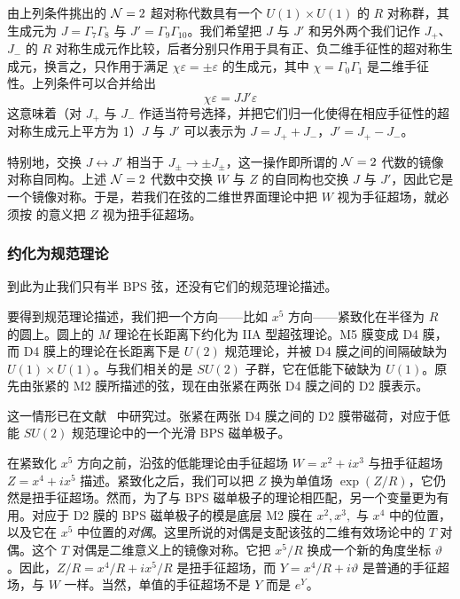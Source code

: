 
由上列条件挑出的 ${\mathcal N}=2$ 超对称代数具有一个 $U(1)\times U(1)$ 的 $R$ 对称群，其生成元为 $J=\Gamma_7\Gamma_8$ 与 $J'=\Gamma_9 \Gamma_{10}$。我们希望把 $J$ 与 $J'$ 和另外两个我们记作 $J_+$、$J_-$ 的 $R$ 对称生成元作比较，后者分别只作用于具有正、负二维手征性的超对称生成元，换言之，只作用于满足 $\chi\varepsilon=\pm \varepsilon$ 的生成元，其中 $\chi=\Gamma_0\Gamma_1$ 是二维手征性。上列条件可以合并给出
\begin{equation}\label{omly}\chi\varepsilon=JJ'\varepsilon\end{equation}
这意味着（对 $J_+$ 与 $J_-$ 作适当符号选择，并把它们归一化使得在相应手征性的超对称生成元上平方为 1）$J$ 与 $J'$ 可以表示为 $J=J_++J_-$，$J'=J_+-J_-$。

特别地，交换 $J\leftrightarrow J'$ 相当于 $J_\pm\to \pm J_\pm$，这一操作即所谓的 ${\mathcal N}=2$ 代数的镜像对称自同构。上述 ${\mathcal N}=2$ 代数中交换 $W$ 与 $Z$ 的自同构也交换 $J$ 与 $J'$，因此它是一个镜像对称。于是，若我们在弦的二维世界面理论中把 $W$ 视为手征超场，就必须按 \cite{GHR} 的意义把 $Z$ 视为扭手征超场。

\subsubsection{约化为规范理论}\label{gaugered}

到此为止我们只有半 BPS 弦，还没有它们的规范理论描述。

要得到规范理论描述，我们把一个方向——比如 $x^5$ 方向——紧致化在半径为 $R$ 的圆上。圆上的 $M$ 理论在长距离下约化为 IIA 型超弦理论。M5 膜变成 D4 膜，而 D4 膜上的理论在长距离下是 $U(2)$ 规范理论，并被 D4 膜之间的间隔破缺为 $U(1)\times U(1)$。与我们相关的是 $SU(2)$ 子群，它在低能下破缺为 $U(1)$。原先由张紧的 M2 膜所描述的弦，现在由张紧在两张 D4 膜之间的 D2 膜表示。

这一情形已在文献~\cite{diac} 中研究过。张紧在两张 D4 膜之间的 D2 膜带磁荷，对应于低能 $SU(2)$ 规范理论中的一个光滑 BPS 磁单极子。

在紧致化 $x^5$ 方向之前，沿弦的低能理论由手征超场 $W=x^2+ix^3$ 与扭手征超场 $Z=x^4+ix^5$ 描述。紧致化之后，我们可以把 $Z$ 换为单值场 $\exp(Z/R)$，它仍然是扭手征超场。然而，为了与 BPS 磁单极子的理论相匹配，另一个变量更为有用。对应于 D2 膜的 BPS 磁单极子的模是底层 M2 膜在 $x^2,x^3,$ 与 $x^4$ 中的位置，以及它在 $x^5$ 中位置的{\it 对偶}。这里所说的对偶是支配该弦的二维有效场论中的 $T$ 对偶。这个 $T$ 对偶是二维意义上的镜像对称。它把 $x^5/R$ 换成一个新的角度坐标 $\vartheta$。因此，$Z/R=x^4/R+ix^5/R$ 是扭手征超场，而 $Y=x^4/R+i\vartheta$ 是普通的手征超场，与 $W$ 一样。当然，单值的手征超场不是 $Y$ 而是 $e^Y$。


